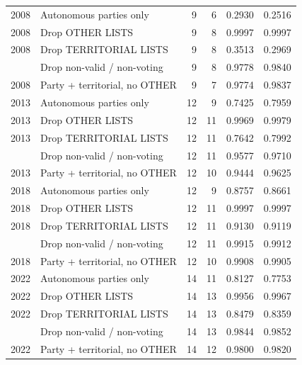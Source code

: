 \begin{longtable}[t]{rlrrrr}
2008 & Autonomous parties only & 9 & 6 & 0.2930 & 0.2516\\
2008 & Drop OTHER LISTS & 9 & 8 & 0.9997 & 0.9997\\
2008 & Drop TERRITORIAL LISTS & 9 & 8 & 0.3513 & 0.2969\\
\addlinespace
2008 & Drop non-valid / non-voting & 9 & 8 & 0.9778 & 0.9840\\
2008 & Party + territorial, no OTHER & 9 & 7 & 0.9774 & 0.9837\\
2013 & Autonomous parties only & 12 & 9 & 0.7425 & 0.7959\\
2013 & Drop OTHER LISTS & 12 & 11 & 0.9969 & 0.9979\\
2013 & Drop TERRITORIAL LISTS & 12 & 11 & 0.7642 & 0.7992\\
\addlinespace
2013 & Drop non-valid / non-voting & 12 & 11 & 0.9577 & 0.9710\\
2013 & Party + territorial, no OTHER & 12 & 10 & 0.9444 & 0.9625\\
2018 & Autonomous parties only & 12 & 9 & 0.8757 & 0.8661\\
2018 & Drop OTHER LISTS & 12 & 11 & 0.9997 & 0.9997\\
2018 & Drop TERRITORIAL LISTS & 12 & 11 & 0.9130 & 0.9119\\
\addlinespace
2018 & Drop non-valid / non-voting & 12 & 11 & 0.9915 & 0.9912\\
2018 & Party + territorial, no OTHER & 12 & 10 & 0.9908 & 0.9905\\
2022 & Autonomous parties only & 14 & 11 & 0.8127 & 0.7753\\
2022 & Drop OTHER LISTS & 14 & 13 & 0.9956 & 0.9967\\
2022 & Drop TERRITORIAL LISTS & 14 & 13 & 0.8479 & 0.8359\\
\addlinespace
2022 & Drop non-valid / non-voting & 14 & 13 & 0.9844 & 0.9852\\
2022 & Party + territorial, no OTHER & 14 & 12 & 0.9800 & 0.9820\\
\bottomrule
\end{longtable}
